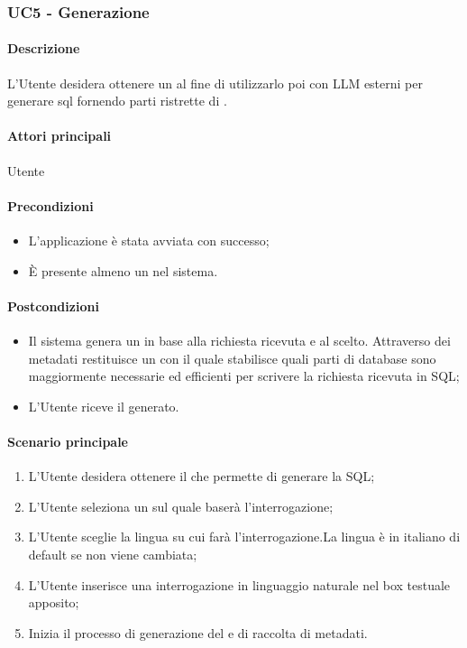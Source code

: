 \subsubsection{UC5 - Generazione }\label{UC5}
\paragraph*{Descrizione}
L’Utente desidera ottenere un  al fine di utilizzarlo poi con LLM esterni per generare  sql fornendo parti ristrette di .

\paragraph*{Attori principali}
Utente

\paragraph*{Precondizioni}
\begin{itemize}
  \item L'applicazione è stata avviata con successo;
  \item È presente almeno un  nel sistema.
\end{itemize}

\paragraph*{Postcondizioni}
\begin{itemize}
  \item Il sistema genera un  in base alla richiesta ricevuta e al  scelto. Attraverso dei metadati restituisce un  con il quale stabilisce quali parti di database sono maggiormente necessarie ed efficienti per scrivere la richiesta ricevuta in SQL;
  \item L’Utente riceve il  generato.
\end{itemize}

\paragraph*{Scenario principale}
\begin{enumerate}
  \item L’Utente desidera ottenere il  che permette di generare la  SQL;
  \item L’Utente seleziona un  sul quale baserà l’interrogazione;
  \item L’Utente sceglie la lingua su cui farà l’interrogazione.La lingua è in italiano di default se non viene cambiata;
  \item L’Utente inserisce una interrogazione in linguaggio naturale nel box testuale apposito;
  \item Inizia il processo di generazione del  e di raccolta di metadati.
\end{enumerate}

